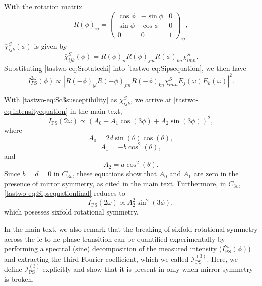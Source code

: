 With the rotation matrix
\begin{equation}
R(\phi)_{ij} = \begin{pmatrix}
\cos{\phi} & -\sin{\phi} & 0 \\
\sin{\phi} & \cos{\phi} & 0 \\
0 & 0 & 1
\end{pmatrix}_{ij},
\end{equation}
$\bar{\chi}^S_{ijk}(\phi)$ is given by
\begin{equation}
\label{tastwo-eq:Srotatechi}
\bar{\chi}^S_{ijk}(\phi) = R(\phi)_{il}R(\phi)_{jm}R(\phi)_{kn}\chi^S_{lmn}.
\end{equation}
Substituting \cref{tastwo-eq:Srotatechi} into \cref{tastwo-eq:Sipsequation}, we then have
\begin{equation}
\label{tastwo-eq:SintensityequationwithR}
I_{PS}^{2\omega}(\phi) \propto \left|R(-\phi)_{yl}R(-\phi)_{jm}R(-\phi)_{kn}\chi^S_{lmn}E_j(\omega)E_k(\omega)\right|^2.
\end{equation}

With \cref{tastwo-eq:Sc3susceptibility} as $\chi^S_{ijk}$, we arrive at \cref{tastwo-eq:intensityequation} in the main text,
\begin{equation}
\label{tastwo-eq:Sipsequationfinal}
I_\mathrm{PS}(2\omega) \propto (A_0 + A_1\cos{(3\phi)} + A_2\sin{(3\phi)})^2,
\end{equation}
where
\begin{equation}
\label{tastwo-eq:sA_0equation}
A_0 = 2d\sin(\theta)\cos(\theta),
\end{equation}
\begin{equation}
\label{tastwo-eq:sA_1equation}
A_1 = -b\cos^{2}(\theta),
\end{equation}
and
\begin{equation}
\label{tastwo-eq:sA_2equation}
A_2 = a\cos^{2}(\theta).
\end{equation}
Since $b = d = 0$ in $C_{3v}$, these equations show that $A_0$ and $A_1$ are zero in the presence of mirror symmetry, as cited in the main text.
Furthermore, in $C_{3v}$, \cref{tastwo-eq:Sipsequationfinal} reduces to
\begin{equation}
I_\mathrm{PS}(2\omega) \propto A_2^2\sin^{2}(3\phi),
\end{equation}
which posesses sixfold rotational symmetry.

In the main text, we also remark that the breaking of sixfold rotational symmetry across the \gls{ic} to \gls{nc} phase transition can be quantified experimentally by performing a spectral (sine) decomposition of the measured intensity ($I_\mathrm{PS}^{2\omega}(\phi)$) and extracting the third Fourier coefficient, which we called $\mathscr{I}_\mathrm{PS}^{(3)}$.
Here, we define $\mathscr{I}_\mathrm{PS}^{(3)}$ explicitly and show that it is present in \tastwo only when mirror symmetry is broken.

